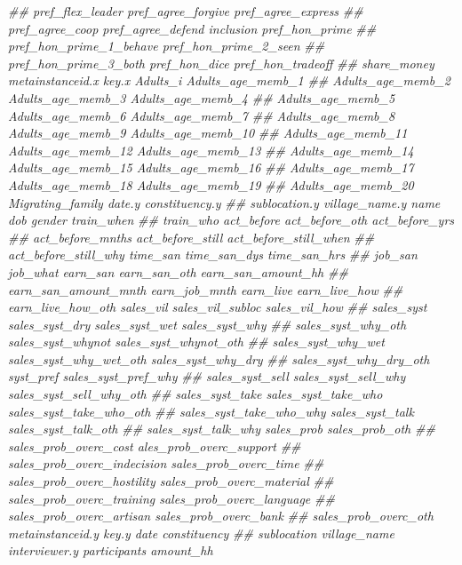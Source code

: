 \documentclass[
]{article}
\newenvironment{Shaded}{\begin{snugshade}}{\end{snugshade}}
\newcommand{\CommentTok}[1]{\textcolor[rgb]{0.56,0.35,0.01}{\textit{#1}}}
\begin{document}
\begin{Shaded}
\begin{Highlighting}[]
\CommentTok{##      pref_flex_leader pref_agree_forgive pref_agree_express}
\CommentTok{##      pref_agree_coop pref_agree_defend inclusion pref_hon_prime}
\CommentTok{##      pref_hon_prime_1_behave pref_hon_prime_2_seen}
\CommentTok{##      pref_hon_prime_3_both pref_hon_dice pref_hon_tradeoff}
\CommentTok{##      share_money metainstanceid.x key.x Adults_i Adults_age_memb_1}
\CommentTok{##      Adults_age_memb_2 Adults_age_memb_3 Adults_age_memb_4}
\CommentTok{##      Adults_age_memb_5 Adults_age_memb_6 Adults_age_memb_7}
\CommentTok{##      Adults_age_memb_8 Adults_age_memb_9 Adults_age_memb_10}
\CommentTok{##      Adults_age_memb_11 Adults_age_memb_12 Adults_age_memb_13}
\CommentTok{##      Adults_age_memb_14 Adults_age_memb_15 Adults_age_memb_16}
\CommentTok{##      Adults_age_memb_17 Adults_age_memb_18 Adults_age_memb_19}
\CommentTok{##      Adults_age_memb_20 Migrating_family date.y constituency.y}
\CommentTok{##      sublocation.y village_name.y name dob gender train_when}
\CommentTok{##      train_who act_before act_before_oth act_before_yrs}
\CommentTok{##      act_before_mnths act_before_still act_before_still_when}
\CommentTok{##      act_before_still_why time_san time_san_dys time_san_hrs}
\CommentTok{##      job_san job_what earn_san earn_san_oth earn_san_amount_hh}
\CommentTok{##      earn_san_amount_mnth earn_job_mnth earn_live earn_live_how}
\CommentTok{##      earn_live_how_oth sales_vil sales_vil_subloc sales_vil_how}
\CommentTok{##      sales_syst sales_syst_dry sales_syst_wet sales_syst_why}
\CommentTok{##      sales_syst_why_oth sales_syst_whynot sales_syst_whynot_oth}
\CommentTok{##      sales_syst_why_wet sales_syst_why_wet_oth sales_syst_why_dry}
\CommentTok{##      sales_syst_why_dry_oth syst_pref sales_syst_pref_why}
\CommentTok{##      sales_syst_sell sales_syst_sell_why sales_syst_sell_why_oth}
\CommentTok{##      sales_syst_take sales_syst_take_who sales_syst_take_who_oth}
\CommentTok{##      sales_syst_take_who_why sales_syst_talk sales_syst_talk_oth}
\CommentTok{##      sales_syst_talk_why sales_prob sales_prob_oth}
\CommentTok{##      sales_prob_overc_cost ales_prob_overc_support}
\CommentTok{##      sales_prob_overc_indecision sales_prob_overc_time}
\CommentTok{##      sales_prob_overc_hostility sales_prob_overc_material}
\CommentTok{##      sales_prob_overc_training sales_prob_overc_language}
\CommentTok{##      sales_prob_overc_artisan sales_prob_overc_bank}
\CommentTok{##      sales_prob_overc_oth metainstanceid.y key.y date constituency}
\CommentTok{##      sublocation village_name interviewer.y participants amount_hh}

\end{Highlighting}
\end{Shaded}
\end{document}
